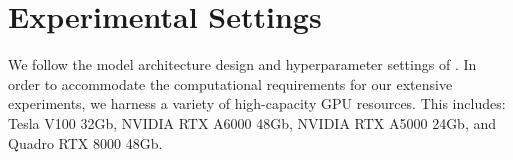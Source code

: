 \section{Experimental Settings \label{app:implementation}}

We follow the model architecture design and hyperparameter settings of \citet{luo2024classic}. In order to accommodate the computational requirements for our extensive experiments, we harness a variety of high-capacity GPU resources. This includes: Tesla V100 32Gb, NVIDIA RTX A6000
48Gb, NVIDIA RTX A5000 24Gb, and Quadro RTX 8000 48Gb.
